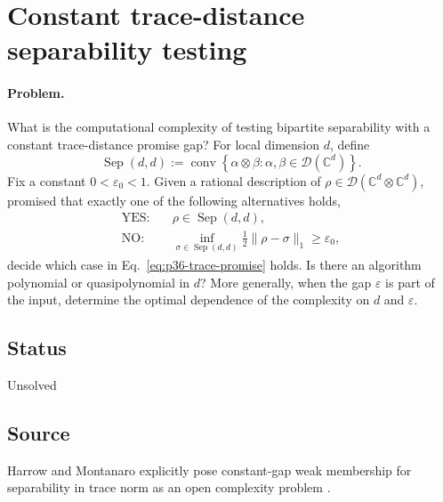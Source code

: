\section{Constant trace-distance separability testing}
\label{sec:op_ec184fc49232a9c0}

\paragraph{Problem.}
What is the computational complexity of testing bipartite separability with
a constant trace-distance promise gap?  For local dimension $d$, define
\begin{equation}
  \operatorname{Sep}(d,d)
  :=\operatorname{conv}\!\left\{
    \alpha\otimes\beta:
    \alpha,\beta\in\mathcal D(\mathbb C^d)
  \right\}.
  \label{eq:p36-separable-set}
\end{equation}
Fix a constant $0<\varepsilon_0<1$.  Given a rational description of
$\rho\in\mathcal D(\mathbb C^d\otimes\mathbb C^d)$, promised that exactly
one of the following alternatives holds,
\begin{equation}
  \begin{aligned}
    \text{YES:}\quad&\rho\in\operatorname{Sep}(d,d),\\
    \text{NO:}\quad&
      \inf_{\sigma\in\operatorname{Sep}(d,d)}
      \frac12\lVert\rho-\sigma\rVert_1\geq\varepsilon_0,
  \end{aligned}
  \label{eq:p36-trace-promise}
\end{equation}
decide which case in Eq.~\eqref{eq:p36-trace-promise} holds.  Is there an
algorithm polynomial or quasipolynomial in $d$?  More generally, when the gap
$\varepsilon$ is part of the input, determine the optimal dependence of the
complexity on $d$ and $\varepsilon$.

\subsection*{Status}

Unsolved

\subsection*{Source}

Harrow and Montanaro explicitly pose constant-gap weak membership for
separability in trace norm as an open complexity problem
.

